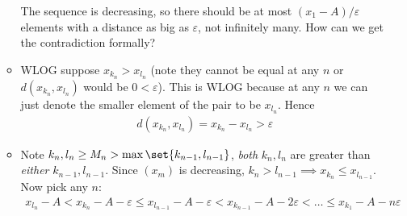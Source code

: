 \documentclass{article}
\begin{document}
\begin{enumerate}
\begin{itemize}[label=$\circ$]
\begin{figure}[H]
        \end{figure}

        The sequence is decreasing, so there should be at most $(x_1 - A) / \varepsilon$ elements with a distance as big as $\varepsilon$, not infinitely many. How can we get the contradiction formally?

      \item WLOG suppose $x_{k_n} > x_{l_n}$ (note they cannot be equal at any $n$ or $d(x_{k_n}, x_{l_n})$ would be $0 < \varepsilon$).  This is WLOG because at any $n$ we can just denote the smaller element of the pair to be $x_{l_n}$. Hence
        \begin{align*}
          d(x_{k_n}, x_{l_n}) = x_{k_n} - x_{l_n} > \varepsilon
        \end{align*}

      \item Note $k_n, l_n \ge M_n > \max\set{k_{n - 1}, l_{n - 1}}$, \textit{both} $k_n, l_n$ are greater than \textit{either} $k_{n - 1}, l_{n - 1}$. Since $(x_m)$ is decreasing, $k_n >  l_{n - 1} \implies x_{k_n} \le x_{l_{n - 1}}$. Now pick any $n$:
        \begin{align*}
          x_{l_n} - A
          <
          x_{k_n} - A - \varepsilon
          \le
          x_{l_{n - 1}} - A - \varepsilon
          <
          x_{k_{n - 1}} - A - 2 \varepsilon
          <
          \ldots
          \le
          x_{k_1} - A - n \varepsilon
        \end{align*}


\end{itemize}
\end{enumerate}
\end{document}
